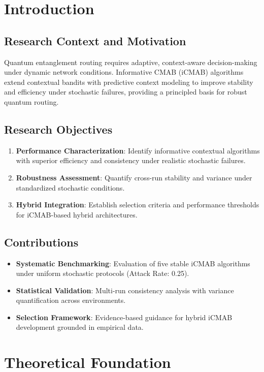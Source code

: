\documentclass[12pt,a4paper]{article}
\begin{document}
\newpage
\section{Introduction}

\subsection{Research Context and Motivation}
Quantum entanglement routing requires adaptive, context-aware decision-making under dynamic network conditions. Informative CMAB (iCMAB) algorithms extend contextual bandits with predictive context modeling to improve stability and efficiency under stochastic failures, providing a principled basis for robust quantum routing.

\subsection{Research Objectives}
\begin{enumerate}
\item \textbf{Performance Characterization}: Identify informative contextual algorithms with superior efficiency and consistency under realistic stochastic failures.
\item \textbf{Robustness Assessment}: Quantify cross-run stability and variance under standardized stochastic conditions.
\item \textbf{Hybrid Integration}: Establish selection criteria and performance thresholds for iCMAB-based hybrid architectures.
\end{enumerate}

\subsection{Contributions}
\begin{itemize}
\item \textbf{Systematic Benchmarking}: Evaluation of five stable iCMAB algorithms under uniform stochastic protocols (Attack Rate: 0.25).
\item \textbf{Statistical Validation}: Multi-run consistency analysis with variance quantification across environments.
\item \textbf{Selection Framework}: Evidence-based guidance for hybrid iCMAB development grounded in empirical data.
\end{itemize}

\section{Theoretical Foundation}
\end{document}
